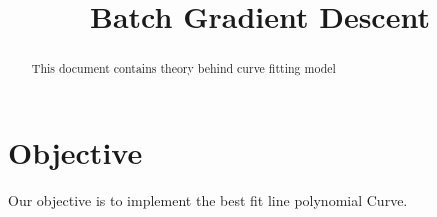 \documentclass[journal,12pt,twocolumn]{IEEEtran}
\begin{document}
\makeatletter
{}
\makeatother
\let\StandardTheFigure\thefigure
\let\vec\mathbf
\renewcommand{\thefigure}{\theproblem}
\def\putbox#1#2#3{\makebox[0in][l]{\makebox[#1][l]{}\raisebox{\baselineskip}[0in][0in]{\raisebox{#2}[0in][0in]{#3}}}}
     \def\rightbox#1{\makebox[0in][r]{#1}}
     \def\centbox#1{\makebox[0in]{#1}}
     \def\topbox#1{\raisebox{-\baselineskip}[0in][0in]{#1}}
\vspace{3cm}
\title{Batch Gradient Descent}
\maketitle
\newpage
\bigskip
\renewcommand{\thefigure}{\theenumi}
\renewcommand{\thetable}{\theenumi}
\begin{abstract}
This document contains theory behind curve fitting model
\end{abstract}
\section{\textbf{Objective}}
Our objective is to implement the best fit line  polynomial Curve.
\end{document}
